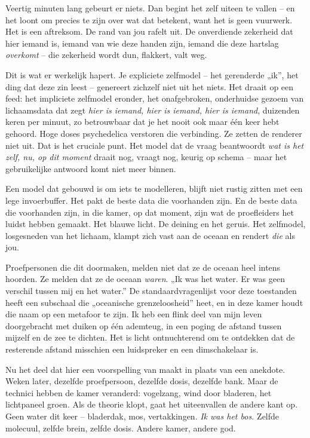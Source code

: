 \documentclass[11pt, twoside, openright]{book}
\begin{document}
Veertig minuten lang gebeurt er niets. Dan begint het zelf uiteen te vallen -- en het loont om precies te zijn over wat dat betekent, want het is geen vuurwerk. Het is een aftreksom. De rand van jou rafelt uit. De onverdiende zekerheid dat hier iemand is, iemand van wie deze handen zijn, iemand die deze hartslag \textit{overkomt} -- die zekerheid wordt dun, flakkert, valt weg.

Dit is wat er werkelijk hapert. Je expliciete zelfmodel -- het gerenderde „ik”, het ding dat deze zin leest -- genereert zichzelf niet uit het niets. Het draait op een feed: het impliciete zelfmodel eronder, het onafgebroken, onderhuidse gezoem van lichaamsdata dat zegt \textit{hier is iemand, hier is iemand, hier is iemand}, duizenden keren per minuut, zo betrouwbaar dat je het nooit ook maar één keer hebt gehoord. Hoge doses psychedelica verstoren die verbinding. Ze zetten de renderer niet uit. Dat is het cruciale punt. Het model dat de vraag beantwoordt \textit{wat is het zelf, nu, op dit moment} draait nog, vraagt nog, keurig op schema -- maar het gebruikelijke antwoord komt niet meer binnen.

Een model dat gebouwd is om iets te modelleren, blijft niet rustig zitten met een lege invoerbuffer. Het pakt de beste data die voorhanden zijn. En de beste data die voorhanden zijn, in die kamer, op dat moment, zijn wat de proefleiders het luidst hebben gemaakt. Het blauwe licht. De deining en het geruis. Het zelfmodel, losgesneden van het lichaam, klampt zich vast aan de oceaan en rendert \textit{die} als jou.

Proefpersonen die dit doormaken, melden niet dat ze de oceaan heel intens hoorden. Ze melden dat ze de oceaan \textit{waren}. „Ik was het water. Er was geen verschil tussen mij en het water.” De standaardvragenlijst voor deze toestanden heeft een subschaal die „oceanische grenzeloosheid” heet, en in deze kamer houdt die naam op een metafoor te zijn. Ik heb een flink deel van mijn leven doorgebracht met duiken op één ademteug, in een poging de afstand tussen mijzelf en de zee te dichten. Het is licht ontnuchterend om te ontdekken dat de resterende afstand misschien een luidspreker en een dimschakelaar is.

Nu het deel dat hier een voorspelling van maakt in plaats van een anekdote. Weken later, dezelfde proefpersoon, dezelfde dosis, dezelfde bank. Maar de technici hebben de kamer veranderd: vogelzang, wind door bladeren, het lichtpaneel groen. Als de theorie klopt, gaat het uiteenvallen de andere kant op. Geen water dit keer -- bladerdak, mos, vertakkingen. \textit{Ik was het bos.} Zelfde molecuul, zelfde brein, zelfde dosis. Andere kamer, andere god.
\end{document}
